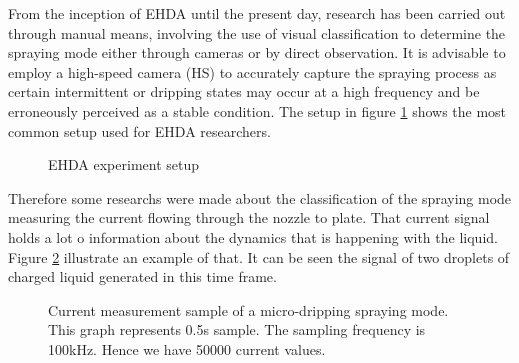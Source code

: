 From the inception of EHDA until the present day, research has been carried out through manual means, involving the use of visual classification to determine the spraying mode either through cameras or by direct observation. It is advisable to employ a high-speed camera (HS) to accurately capture the spraying process as certain intermittent or dripping states may occur at a high frequency and be erroneously perceived as a stable condition.
The setup in figure \ref{fig:ehda_setup} shows the most common setup used for EHDA researchers.

\begin{figure}[H]
  \centering
  \caption{EHDA experiment setup \cite{Luewton}}
  \label{fig:ehda_setup}
\end{figure}


Therefore some researchs were made about the classification of the spraying mode measuring the current flowing through the nozzle to plate\cite{Sjaaks}\cite{Chen_Pui}. That current signal holds a lot o information 
about the dynamics that is happening with the liquid. Figure \ref{fig:microdripping_current_pic} illustrate an example of that. It can be seen the signal of two droplets of charged liquid generated in this time frame.


\begin{figure}[H]
    \centering
    \caption{Current measurement sample of a micro-dripping spraying mode. This graph represents 0.5s sample. The sampling frequency is 100kHz. Hence we have 50000 current values.}
    \label{fig:microdripping_current_pic}
  \end{figure}

